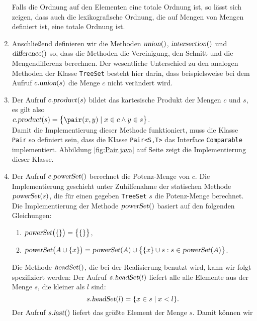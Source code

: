 \begin{enumerate}
      Falls die Ordnung auf den Elementen eine totale Ordnung ist, so l\"asst sich zeigen,
      dass auch die lexikografische Ordnung, die auf Mengen von Mengen definiert ist, eine
      totale Ordnung ist. 
\item Anschlie\ss{}end definieren wir die Methoden 
      $\textsl{union}()$,
      $\textsl{intersection}()$ und
      $\textsl{difference}()$ so, dass die Methoden  die Vereinigung, den Schnitt und die
      Mengendifferenz berechnen.  Der wesentliche Unterschied zu den analogen Methoden der
      Klasse \texttt{TreeSet} besteht hier darin, dass beispielsweise bei dem Aufruf 
      $c.\textsl{union}(s)$ die Menge $c$ nicht ver\"andert wird.
\item Der Aufruf $c.\textsl{product}(s)$ bildet das kartesische Produkt der Mengen
      $c$ und $s$, es gilt also 
      \\[0.2cm]
      \hspace*{1.3cm}
      $c.\textsl{product}(s) = \bigl\{ \pair(x,y) \mid x \in c \wedge y \in s \bigr\}$.
      \\[0.2cm]
      Damit die Implementierung dieser Methode funktioniert,  muss die Klasse \texttt{Pair} so definiert
      sein, dass die Klasse \texttt{Pair<S,T>} das Interface \texttt{Comparable} implementiert.
      Abbildung  \ref{fig:Pair.java} auf Seite \pageref{fig:Pair.java} zeigt die Implementierung dieser Klasse.
\item Der Aufruf $c.\textsl{powerSet}()$ berechnet die Potenz-Menge von $c$.
      Die Implementierung geschieht unter Zuhilfenahme der statischen Methode
      $\textsl{powerSet}(s)$, die f\"ur einen gegeben \texttt{TreeSet} $s$ die Potenz-Menge 
      berechnet. Die Implementierung der Methode $\textsl{powerSet}()$ basiert auf den folgenden Gleichungen:
      \begin{enumerate}
      \item $\textsl{powerSet}\bigl(\{\}\bigr) = \bigl\{ \{\} \bigr\}$,
      \item $\textsl{powerSet}\bigl(A \cup \{x\} \bigr) = 
             \textsl{powerSet}(A) \cup \bigl\{ \{x\} \cup s : s \in \textsl{powerSet}(A) \bigr\}$.
      \end{enumerate}
      Die Methode $\textsl{headSet}()$, die bei der Realisierung benutzt wird, kann wir
      folgt spezifiziert werden: Der Aufruf $s.\textsl{headSet}(l)$ liefert alle alle
      Elemente aus der Menge $s$, die kleiner als $l$ sind:
      \[ s.\textsl{headSet}(l) = \{ x \in s \mid x < l \}. \]
      Der Aufruf $s.\textsl{last}()$ liefert das gr\"o\ss{}te Element der Menge $s$.  Damit k\"onnen wir

\end{enumerate}
